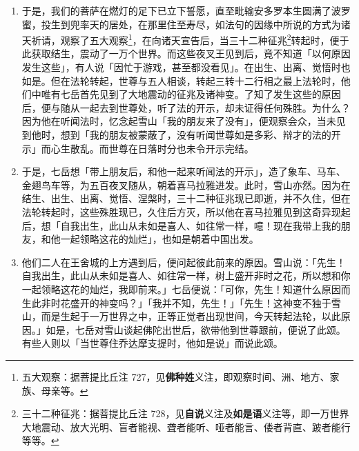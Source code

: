 \begin{enumerate}
\item 于是，我们的菩萨在燃灯的足下已立下誓愿，直至毗输安多罗本生圆满了波罗蜜，投生到兜率天的居处，在那里住至寿尽，如法句的因缘中所说的方式为诸天祈请，观察了五大观察\footnote{五大观察：据菩提比丘注 727，见\textbf{佛种姓}义注，即观察时间、洲、地方、家族、母亲等。}，在向诸天宣告后，当三十二种征兆\footnote{三十二种征兆：据菩提比丘注 728，见\textbf{自说}义注及\textbf{如是语}义注等，即一万世界大地震动、放大光明、盲者能视、聋者能听、哑者能言、偻者背直、跛者能行等等。}转起时，便于此获取结生，震动了一万个世界。而这些夜叉王见到后，竟不知道「以何原因发生这些」，有人说「因忙于游戏，甚至都没看见」。在出生、出离、觉悟时也如是。但在法轮转起，世尊与五人相谈，转起三转十二行相之最上法轮时，他们中唯有七岳首先见到了大地震动的征兆及诸神变。了知了发生这些的原因后，便与随从一起去到世尊处，听了法的开示，却未证得任何殊胜。为什么？因为他在听闻法时，忆念起雪山「我的朋友来了没有」，便观察会众，当未见到他时，想到「我的朋友被蒙蔽了，没有听闻世尊如是多彩、辩才的法的开示」而心生散乱。而世尊在日落时分也未令开示完结。
\item 于是，七岳想「带上朋友后，和他一起来听闻法的开示」，造了象车、马车、金翅鸟车等，为五百夜叉随从，朝着喜马拉雅进发。此时，雪山亦然。因为在结生、出生、出离、觉悟、涅槃时，三十二种征兆现已即逝，并不久住，但在法轮转起时，这些殊胜现已，久住后方灭，所以他在喜马拉雅见到这奇异现起后，想「自我出生，此山从未如是喜人、如往常一样，噫！现在我带上我的朋友，和他一起领略这花的灿烂」，也如是朝着中国出发。
\item 他们二人在王舍城的上方遇到后，便问起彼此前来的原因。雪山说：「先生！自我出生，此山从未如是喜人、如往常一样，树上盛开非时之花，所以想和你一起领略这花的灿烂，我即前来。」七岳便说：「可你，先生！知道什么原因而生此非时花盛开的神变吗？」「我并不知，先生！」「先生！这神变不独于雪山，而是生起于一万世界之中，正等正觉者出现世间，今天转起法轮，以此原因。」如是，七岳对雪山谈起佛陀出世后，欲带他到世尊跟前，便说了此颂。有些人则以「当世尊住乔达摩支提时，他如是说」而说此颂。

\end{enumerate}
